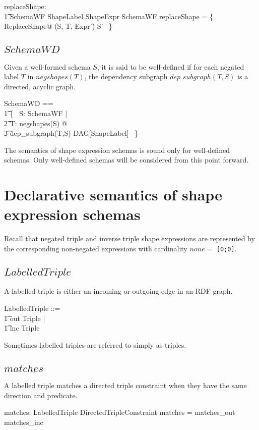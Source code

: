 \documentclass{article}
\begin{document}
\begin{axdef}
	replaceShape: \\
\t1		SchemaWF \cross ShapeLabel \cross ShapeExpr \pfun SchemaWF
\where
	replaceShape = \{~ ReplaceShape@ (S, T, Expr') \mapsto S' ~\}
\end{axdef}

\subsection{$SchemaWD$}
Given a well-formed schema $S$, it is said to be well-defined if for each negated label $T$ in $negshapes(T)$, the dependency subgraph
$dep\_subgraph(T,S)$ is a directed, acyclic graph.
\begin{zed}
	SchemaWD == \\
\t1		\{~ S: SchemaWF | \\
\t2			\forall T: negshapes(S) @ \\
\t3				dep\_subgraph(T,S) \in DAG[ShapeLabel] ~\}
\end{zed}

The semantics of shape expression schemas is sound only for well-defined schemas.
Only well-defined schemas will be considered from this point forward.

\section{Declarative semantics of shape expression schemas}
\label{sec-declarative-semantics}

Recall that negated triple and inverse triple shape expressions are represented by the corresponding non-negated expressions with cardinality
$none =$ {\tt [0;0]}.

\subsection{$LabelledTriple$}
A labelled triple is either an incoming or outgoing edge in an RDF graph.
\begin{zed}
	LabelledTriple ::= \\
\t1		out \ldata Triple \rdata | \\
\t1		inc \ldata Triple \rdata
\end{zed}

Sometimes labelled triples are referred to simply as triples.

\subsection{$matches$}
A labelled triple matches a directed triple constraint when they have the same direction and predicate.
\begin{axdef}
	matches: LabelledTriple \rel DirectedTripleConstraint
\where
	matches = matches\_out \cup matches\_inc
\end{axdef}
\end{document}
